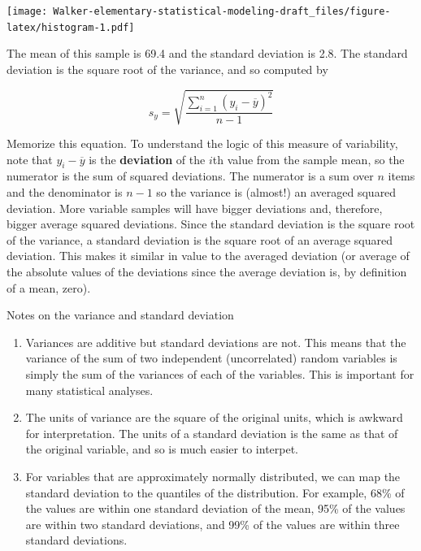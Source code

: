 \documentclass[]{book}
\providecommand{\tightlist}{%
  \setlength{\itemsep}{0pt}\setlength{\parskip}{0pt}}
\theoremstyle{definition}
\theoremstyle{definition}
\theoremstyle{definition}
\theoremstyle{remark}
\begin{document}
\texttt{[image: Walker-elementary-statistical-modeling-draft\_files/figure-latex/histogram-1.pdf]}

The mean of this sample is 69.4 and the standard deviation is 2.8. The
standard deviation is the square root of the variance, and so computed
by

\begin{equation}
s_y = \sqrt{\frac{\sum_{i=1}^n{(y_i - \overline{y})^2}}{n-1}}
\label{eq:variance}
\end{equation}

Memorize this equation. To understand the logic of this measure of
variability, note that \(y_i - \overline{y}\) is the \textbf{deviation}
of the \(i\)th value from the sample mean, so the numerator is the sum
of squared deviations. The numerator is a sum over \(n\) items and the
denominator is \(n-1\) so the variance is (almost!) an averaged squared
deviation. More variable samples will have bigger deviations and,
therefore, bigger average squared deviations. Since the standard
deviation is the square root of the variance, a standard deviation is
the square root of an average squared deviation. This makes it similar
in value to the averaged deviation (or average of the absolute values of
the deviations since the average deviation is, by definition of a mean,
zero).

Notes on the variance and standard deviation

\begin{enumerate}
\def\labelenumi{\arabic{enumi}.}
\tightlist
\item
  Variances are additive but standard deviations are not. This means
  that the variance of the sum of two independent (uncorrelated) random
  variables is simply the sum of the variances of each of the variables.
  This is important for many statistical analyses.
\item
  The units of variance are the square of the original units, which is
  awkward for interpretation. The units of a standard deviation is the
  same as that of the original variable, and so is much easier to
  interpet.
\item
  For variables that are approximately normally distributed, we can map
  the standard deviation to the quantiles of the distribution. For
  example, 68\% of the values are within one standard deviation of the
  mean, 95\% of the values are within two standard deviations, and 99\%
  of the values are within three standard deviations.
\end{enumerate}
\end{document}
